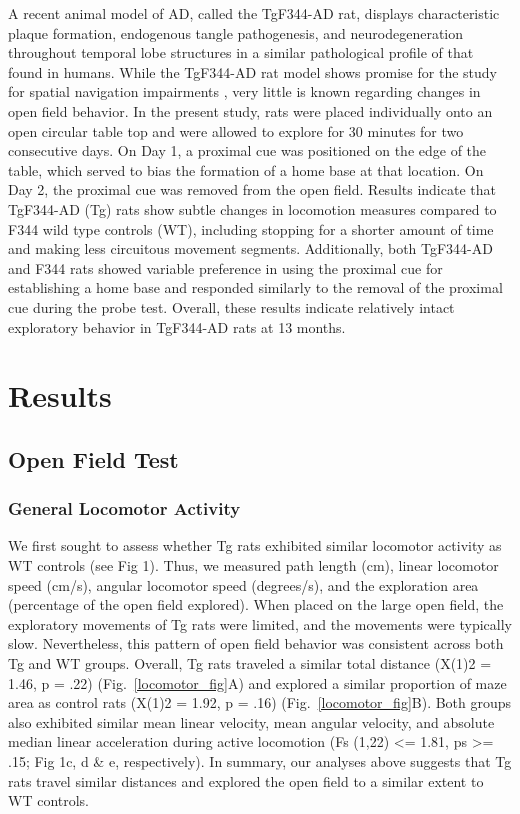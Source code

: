 \documentclass[fleqn,10pt]{wlscirep}
\begin{document}
A recent animal model of AD, called the TgF344-AD rat, displays characteristic plaque formation, endogenous tangle pathogenesis, and neurodegeneration throughout temporal lobe structures in a similar pathological profile of that found in humans. While the TgF344-AD rat model shows promise for the study for spatial navigation impairments \cite{berkowitz_progressive_2018}, very little is known regarding changes in open field behavior. In the present study, rats were placed individually onto an open circular table top and were allowed to explore for 30 minutes for two consecutive days. On Day 1, a proximal cue was positioned on the edge of the table, which served to bias the formation of a home base at that location. On Day 2, the proximal cue was removed from the open field. Results indicate that TgF344-AD (Tg) rats show subtle changes in locomotion measures compared to F344 wild type controls (WT), including stopping for a shorter amount of time and making less circuitous movement segments. Additionally, both TgF344-AD and F344 rats showed variable preference in using the proximal cue for establishing a home base and responded similarly to the removal of the proximal cue during the probe test. Overall, these results indicate relatively intact exploratory behavior in TgF344-AD rats at 13 months.   

\section*{Results}

\subsection*{Open Field Test}

\subsubsection*{General Locomotor Activity}
We first sought to assess whether Tg rats exhibited similar locomotor activity as WT controls (see Fig 1). Thus, we measured path length (cm), linear locomotor speed (cm/s), angular locomotor speed (degrees/s), and the exploration area (percentage of the open field explored). When placed on the large open field, the exploratory movements of Tg rats were limited, and the movements were typically slow. Nevertheless, this pattern of open field behavior was consistent across both Tg and WT groups. Overall, Tg rats traveled a similar total distance (X(1)2 = 1.46, p = .22) (Fig.~\ref{locomotor_fig}A) and explored a similar proportion of maze area as control rats (X(1)2 = 1.92, p = .16) (Fig.~\ref{locomotor_fig}B). Both groups also exhibited similar mean linear velocity, mean angular velocity, and absolute median linear acceleration during active locomotion (Fs (1,22) <= 1.81, ps >= .15; Fig 1c, d \& e, respectively). In summary, our analyses above suggests that Tg rats travel similar distances and explored the open field to a similar extent to WT controls.  
\end{document}
